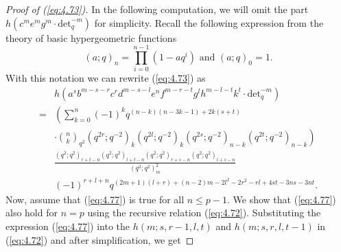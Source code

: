 \documentclass[10pt,a4paper]{amsart}
\begin{document}
\begin{proof}[Proof of (\ref{eq:4.73})]
    In the following computation, we will omit the part $h\left(c^me^mg^m\cdot\text{det}_q^{-m}\right)$ for simplicity. Recall the following expression from the theory of basic hypergeometric functions
    \begin{equation}\label{eq:4.71+}
        (a;q)_n=\prod_{i=0}^{n-1}(1-aq^i) \text{ and }(a;q)_0=1.
    \end{equation}
    With this notation we can rewrite (\ref{eq:4.73}) as
    \begin{equation}\label{eq:4.77}
        \begin{split}
            &h\left(a^sb^{m-s-r}c^rd^{m-s-l}e^{n}f^{m-r-t}g^lh^{m-l-t}k^t\cdot\text{det}_q^{-m}\right)\\
            =&\left(\sum_{k=0}^{n}(-1)^{k}q^{(n-k)(n-3k-1)+2k(s+t)}\right.\\
            &\left.\cdot{n\choose k}_{q^{2}}(q^{2r};q^{-2})_k(q^{2l};q^{-2})_k(q^{2s};q^{-2})_{n-k}(q^{2t};q^{-2})_{n-k}\right)\\
            &\frac{(q^2;q^2)_{r+t-n}(q^2;q^2)_{l+t-n}(q^2;q^2)_{r+s-n}(q^2;q^2)_{l+s-n}}{(q^2;q^2)_m^2}\\
            &(-1)^{r+l+n}q^{(2m+1)(l+r)+(n-2)m-2l^2-2r^2-rl+4st-3ns-3nt}.
        \end{split}
    \end{equation}
    Now, assume that (\ref{eq:4.77}) is true for all $n\le p-1$. We show that (\ref{eq:4.77}) also hold for $n=p$ using the recursive relation (\ref{eq:4.72}). Substituting the expression (\ref{eq:4.77}) into the $h(m;s,r-1,l,t)$ and $h(m;s,r,l,t-1)$ in (\ref{eq:4.72}) and after simplification, we get

\end{proof}
\end{document}

